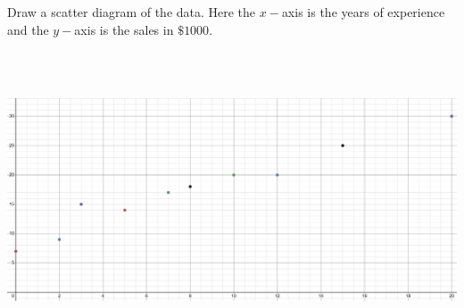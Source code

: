 Draw a scatter diagram of the data. Here the $x-$axis is the years of experience and the $y-$axis is the
sales in $\$1000$.\\\\

\begin{solution}\renewcommand{\qedsymbol}{}\ \\
    \begin{center}
        \includegraphics[scale=0.5]{scatplot.JPG}
    \end{center}
\end{solution}